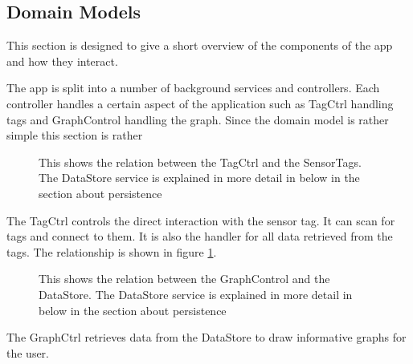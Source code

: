 \documentclass[]{article}
\begin{document}
\subsection{Domain Models}

This section is designed to give a short overview of the components of the app and how they interact.

The app is split into a number of background services and controllers. Each controller handles a certain aspect of the application such as TagCtrl handling tags and GraphControl handling the graph. Since the domain model is rather simple this section is rather 

\begin{figure}
\center
{}
\caption{This shows the relation between the TagCtrl and the SensorTags. The DataStore service is explained in more detail in below in the section about persistence}
\label{figTagCtrl}
\end{figure}

The TagCtrl controls the direct interaction with the sensor tag. It can scan for tags and connect to them. It is also the handler for all data retrieved from the tags. The relationship is shown in figure \ref{figTagCtrl}.

\begin{figure}
\center
{}
\caption{This shows the relation between the GraphControl and the DataStore. The DataStore service is explained in more detail in below in the section about persistence}
\label{figGraphCtrl}
\end{figure}

The GraphCtrl retrieves data from the DataStore to draw informative graphs for the user.
\end{document}
